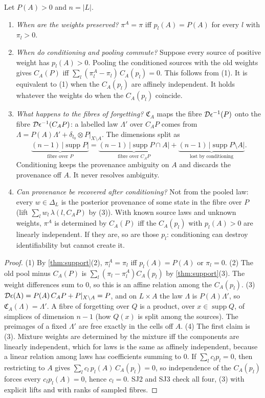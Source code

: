 \documentclass[11pt]{article}
\theoremstyle{definition}\newtheorem{definition}[theorem]{Definition}\newtheorem{remark}[theorem]{Remark}\newtheorem{example}[theorem]{Example}
\begin{document}
\begin{proposition}\label{prop:four}
Let $P(A)>0$ and $n=|L|$.
\begin{enumerate}
\item[(1)] \emph{When are the weights preserved?} $\pi^A=\pi$ iff $p_l(A)=P(A)$ for every $l$ with $\pi_l>0$.
\item[(2)] \emph{When do conditioning and pooling commute?} Suppose every source of positive weight has $p_l(A)>0$. Pooling the
  conditioned sources with the old weights gives $C_A(P)$ iff $\sum_l(\pi^A_l-\pi_l)\,C_A(p_l)=0$. This follows from (1). It is equivalent to (1)
  when the $C_A(p_l)$ are affinely independent. It holds whatever the weights do when the $C_A(p_l)$ coincide.
\item[(3)] \emph{What happens to the fibres of forgetting?} $\mathfrak C_A$ maps the fibre $\mathcal D\epsilon^{-1}(P)$ onto the fibre $\mathcal D\epsilon^{-1}(C_AP)$: a
  labelled law $\Lambda'$ over $C_AP$ comes from $\Lambda=P(A)\Lambda'+\delta_{l_0}\otimes P|_{X\setminus A}$. The dimensions split as
  \[
  \underbrace{(n-1)\,|\operatorname{supp}P|}_{\text{fibre over }P}=\underbrace{(n-1)\,|\operatorname{supp}P\cap A|}_{\text{fibre over }C_AP}+
  \underbrace{(n-1)\,|\operatorname{supp}P\setminus A|}_{\text{lost by conditioning}} .
  \]
  Conditioning keeps the provenance ambiguity on $A$ and discards the provenance off $A$. It never resolves ambiguity.
\item[(4)] \emph{Can provenance be recovered after conditioning?} Not from the pooled law: every $w\in\Delta_L$ is the posterior
  provenance of some state in the fibre over $P$ (lift $\sum_lw_l\,\lambda(l,C_AP)$ by (3)). With known source laws and unknown weights,
  $\pi^A$ is determined by $C_A(P)$ iff the $C_A(p_l)$ with $p_l(A)>0$ are linearly independent. If they are, so are those $p_l$:
  conditioning can destroy identifiability but cannot create it.
\end{enumerate}
\end{proposition}

\begin{proof}
(1) By \cref{thm:support}(2), $\pi^A_l=\pi_l$ iff $p_l(A)=P(A)$ or $\pi_l=0$. (2) The old pool minus $C_A(P)$ is $\sum_l(\pi_l-\pi^A_l)C_A(p_l)$ by
\cref{thm:support}(3). The weight differences sum to $0$, so this is an affine relation among the $C_A(p_l)$. (3) $\mathcal D\epsilon(\Lambda)=P(A)\,C_AP+P|_{X\setminus A}=P$,
and on $L\times A$ the law $\Lambda$ is $P(A)\Lambda'$, so $\mathfrak C_A(\Lambda)=\Lambda'$. A fibre of forgetting over $Q$ is a product, over $x\in\operatorname{supp}Q$,
of simplices of dimension $n-1$ (how $Q(x)$ is split among the sources). The preimages of a fixed $\Lambda'$ are free exactly in the cells off
$A$. (4) The first claim is (3). Mixture weights are determined by the mixture iff the components are linearly independent, which for
laws is the same as affinely independent, because a linear relation among laws has coefficients summing to $0$. If $\sum_lc_lp_l=0$, then
restricting to $A$ gives $\sum_lc_l\,p_l(A)\,C_A(p_l)=0$, so independence of the $C_A(p_l)$ forces every $c_lp_l(A)=0$, hence $c_l=0$. SJ2 and SJ3
check all four, (3) with explicit lifts and with ranks of sampled fibres.
\end{proof}
\end{document}
